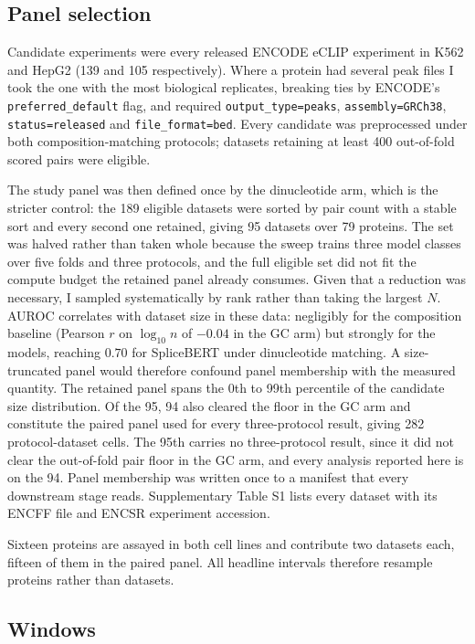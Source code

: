 \subsection{Panel selection}
\label{sec:panel}

Candidate experiments were every released ENCODE eCLIP experiment in K562 and HepG2 (139 and 105
respectively). Where a protein had several peak files I took the one with the most biological
replicates, breaking ties by ENCODE's \texttt{preferred\_default} flag, and required
\texttt{output\_type=peaks}, \texttt{assembly=GRCh38}, \texttt{status=released} and
\texttt{file\_format=bed}. Every candidate was preprocessed under both composition-matching
protocols; datasets retaining at least 400 out-of-fold scored pairs were eligible.

The study panel was then defined once by the dinucleotide arm, which is the stricter control:
the 189 eligible datasets were sorted by pair count with a stable sort and every second one
retained, giving 95 datasets over 79 proteins. The set was halved rather than taken whole
because the sweep trains three model classes over five folds and three protocols, and the full
eligible set did not fit the compute budget the retained panel already consumes. Given that a
reduction was necessary, I sampled systematically by rank rather than taking the largest $N$.
AUROC correlates with dataset size in these data: negligibly for the composition baseline
(Pearson $r$ on $\log_{10} n$ of $-0.04$ in the GC arm) but strongly for the models, reaching
$0.70$ for SpliceBERT under dinucleotide matching. A size-truncated panel would therefore
confound panel membership with the measured quantity. The retained panel spans the 0th to 99th
percentile of the candidate size distribution. Of the 95, 94 also cleared the floor
in the GC arm and constitute the paired panel used for every three-protocol result, giving 282
protocol-dataset cells. The 95th carries no three-protocol result, since it did not clear the
out-of-fold pair floor in the GC arm, and every analysis reported here is on the 94. Panel membership was written once
to a manifest that every downstream stage reads. Supplementary Table S1 lists every dataset with
its ENCFF file and ENCSR experiment accession.

Sixteen proteins are assayed in both cell lines and contribute two datasets each, fifteen of
them in the paired panel. All headline intervals therefore resample proteins rather than
datasets.

\subsection{Windows}
\label{sec:windows}

